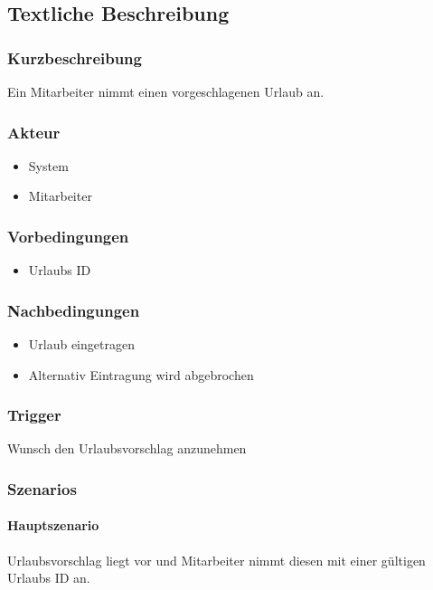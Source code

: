 \subsection{Textliche Beschreibung}

\subsubsection{Kurzbeschreibung}
Ein Mitarbeiter nimmt einen vorgeschlagenen Urlaub an.

\subsubsection{Akteur}
\begin{itemize}
	\item System
	\item Mitarbeiter
\end{itemize}

\subsubsection{Vorbedingungen}
\begin{itemize}
	\item Urlaubs ID
\end{itemize}

\subsubsection{Nachbedingungen}
\begin{itemize}
	\item Urlaub eingetragen
	\item Alternativ Eintragung wird abgebrochen
\end{itemize}

\subsubsection{Trigger}
Wunsch den Urlaubsvorschlag anzunehmen

\subsubsection{Szenarios}
\paragraph{Hauptszenario}
Urlaubsvorschlag liegt vor und Mitarbeiter nimmt diesen mit einer gültigen Urlaubs ID an.

